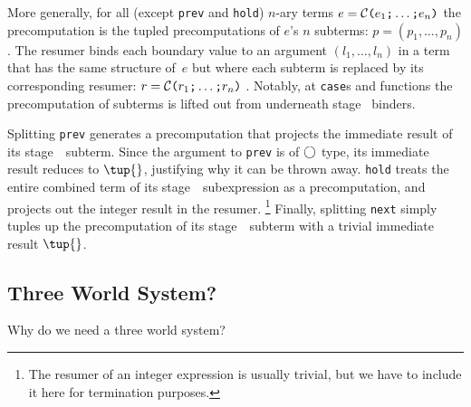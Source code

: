 \begin{abstrsyn}
More generally, for all (except \texttt{prev} and \texttt{hold}) 
$n$-ary terms $e = \mathcal{C}\texttt{(} e_1 \texttt{;} \ldots \texttt{;} e_n \texttt{)}$ 
the precomputation is the tupled precomputations of $e$'s $n$ subterms:
$p=(p_1,\ldots,p_n)$.  The resumer binds each boundary value to an
argument $(l_1,\ldots,l_n)$ in a term that has the same structure
of~$e$ but where each subterm is replaced by its corresponding resumer:
$r = \mathcal{C}\texttt{(} r_1 \texttt{;} \ldots \texttt{;} r_n \texttt{)}$ .
Notably, at \texttt{case}s and functions the
precomputation of subterms is lifted out from underneath stage \bbtwo\ binders.  

Splitting \texttt{prev} generates a precomputation that projects the immediate result of its stage~\bbone\ subterm.
Since the argument to \texttt{prev} is of $\bigcirc$ type, its immediate result reduces to $\tup{}$, justifying why it can be thrown away.
\texttt{hold} treats the entire combined term of its stage~\bbone\ subexpression as a precomputation, 
and projects out the integer result in the resumer. 
\footnote{The resumer of an integer expression is usually trivial, 
but we have to include it here for termination purposes.} 
Finally, splitting \texttt{next} simply tuples up the precomputation of its stage~\bbtwo\ subterm with a trivial immediate result $\tup{}$.

\subsection {Three World System?}

Why do we need a three world system?

\end{abstrsyn}




